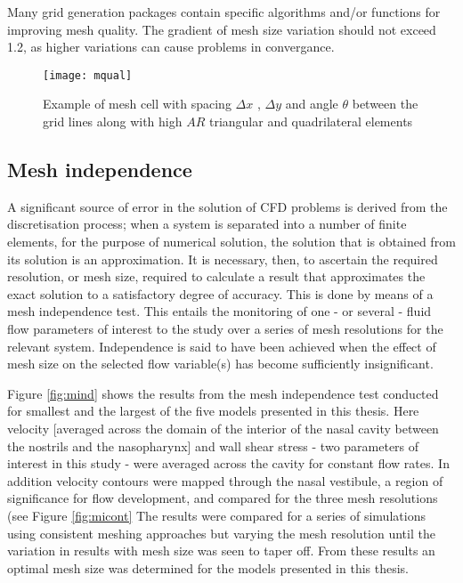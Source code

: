 Many grid generation packages contain specific algorithms and/or functions for improving mesh quality. The gradient of mesh size variation should not exceed 1.2, as higher variations can cause problems in convergance.

\begin{figure}
  \texttt{[image: mqual]}
  \caption{Example of mesh cell with spacing $\Delta x$ , $\Delta y$ and angle $ \theta $ between the grid lines along with high $AR$ triangular and quadrilateral elements } \label{fig:mqual}
\end{figure}
 
\subsection{Mesh independence}

A significant source of error in the solution of CFD problems is derived from the discretisation process; when a system is separated into a number of finite elements, for the purpose of numerical solution, the solution that is obtained from its solution is an approximation. It is necessary, then, to ascertain the required resolution, or mesh size, required to calculate a result that approximates the exact solution to a satisfactory degree of accuracy. This is done by means of a mesh independence test. This entails the monitoring of one - or several - fluid flow parameters of interest to the study over a series of mesh resolutions for the relevant system. Independence is said to have been achieved when the effect of mesh size on the selected flow variable(s) has become sufficiently insignificant. 

Figure \ref{fig:mind} shows the results from the mesh independence test conducted for smallest and the largest of the five models presented in this thesis. Here velocity [averaged across the domain of the interior of the nasal cavity between the nostrils and the nasopharynx] and wall shear stress - two parameters of interest in this study - were averaged across the cavity for constant flow rates. In addition velocity contours were mapped through the nasal vestibule, a region of significance for flow development, and compared for the three mesh resolutions (see Figure \ref{fig:micont} The results were compared for a series of simulations using consistent meshing approaches but varying the mesh resolution until the variation in results with mesh size was seen to taper off. From these results an optimal mesh size was determined for the models presented in this thesis. 

